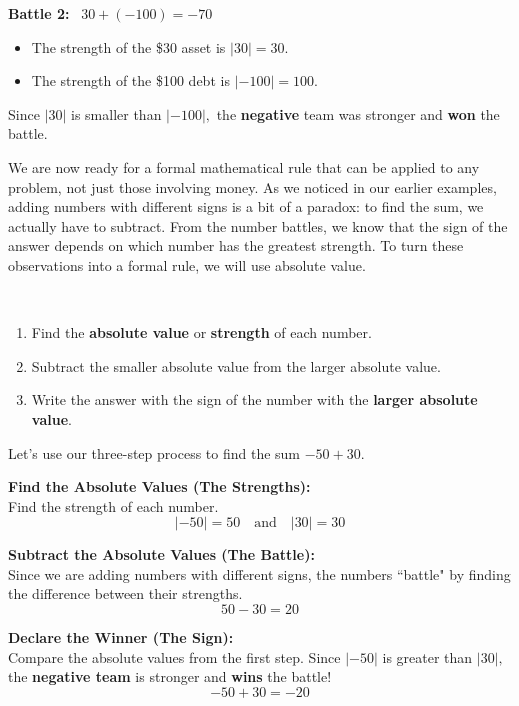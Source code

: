 \documentclass{ximera}[font=12pt]
\begin{document}
\textbf{Battle 2:} \ $30 + (-100) = -70$
\begin{itemize}
    \item The strength of the \$30 asset is $|30| = 30$.
    \item The strength of the \$100 debt is $|-100| = 100$.
\end{itemize}

Since $|30|$ is smaller than $|-100|,$ the \textbf{negative} team was stronger and \textbf{won} the battle.

We are now ready for a formal mathematical rule that can be applied to any problem, not just those involving money.  
As we noticed in our earlier examples, adding numbers with different signs is a bit of a paradox: to find the sum, 
we actually have to subtract.  From the number battles, we know that the sign of the answer depends on which number 
has the greatest strength. To turn these observations into a formal rule, we will use absolute value.


\begin{procedure}

    ~ \\[2pt]
\begin{enumerate} 
    \item Find the \textbf{absolute value} or \textbf{strength} of each number.

     \item Subtract the smaller absolute value from the larger absolute value.

     \item Write the answer with the sign of the number with the \textbf{larger absolute value}.
\end{enumerate}
\end{procedure}




\begin{example} Let's use our three-step process to find the sum $-50 + 30.$

\begin{description}[style=multiline, leftmargin=5em, font=\bfseries]
    \item[Step 1] \textbf{Find the Absolute Values (The Strengths):} \\
    Find the strength of each number.
    \[ |-50| = 50 \quad \text{and} \quad |30| = 30 \]

    \item[Step 2] \textbf{Subtract the Absolute Values (The Battle):} \\
    Since we are adding numbers with different signs, the numbers ``battle" by finding the difference between their strengths.
    \[ 50 - 30 = 20 \]

    \item[Step 3] \textbf{Declare the Winner (The Sign):} \\
    Compare the absolute values from the first step. Since $|-50|$ is greater than $|30|,$ the \textbf{negative team}
     is stronger and \textbf{wins} the battle!  
    \[ -50 + 30 = -20 \]
\end{description}

\end{example}
\end{document}
